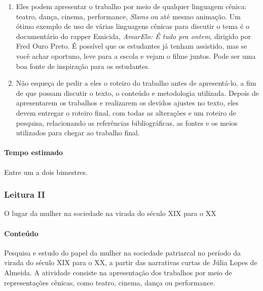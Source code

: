 \documentclass[12pt]{extarticle}
\begin{document}
\begin{enumerate}
\item
Eles podem apresentar o trabalho por meio de qualquer linguagem
cênica: teatro, dança, cinema, performance, \emph{Slams} ou até mesmo
animação. Um ótimo exemplo de uso de várias linguagens cênicas para
discutir o tema é o documentário do rapper Emicida, \emph{AmarElo: É
tudo pra ontem}, dirigido por Fred Ouro Preto. É possível que os
estudantes já tenham assistido, mas se você achar oportuno, leve para a
escola e vejam o filme juntos. Pode ser uma boa fonte de inspiração para
os estudantes.

\item
Não esqueça de pedir a eles o roteiro do trabalho antes de
apresentá-lo, a fim de que possam discutir o texto, o conteúdo e
metodologia utilizada. Depois de apresentarem os trabalhos e realizarem
os devidos ajustes no texto, eles devem entregar o roteiro final, com
todas as alterações e um roteiro de pesquisa, relacionando as
referências bibliográficas, as fontes e os meios utilizados para chegar
ao trabalho final.
\end{enumerate}

\paragraph{Tempo estimado} Entre um a dois bimestres.



\subsubsection{Leitura II} O lugar da mulher na sociedade na virada do século \textsc{XIX} para o \textsc{XX}







\paragraph{Conteúdo} Pesquisa e estudo do papel da mulher na sociedade
patriarcal no período da virada do século \textsc{XIX} para o \textsc{XX}, a partir das
narrativas curtas de Júlia Lopes de Almeida. A atividade consiste na
apresentação dos trabalhos por meio de representações cênicas, como
teatro, cinema, dança ou performance.
\end{document}

